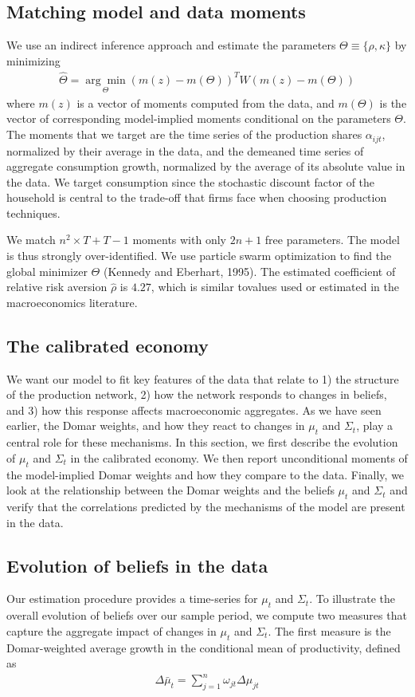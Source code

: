 \documentclass[11pt]{article}
\theoremstyle{definition}
\begin{document}
	\subsection*{Matching model and data moments}
	We use an indirect inference approach and estimate the parameters $\Theta \equiv \{\rho, \kappa\}$ by minimizing
	\begin{align*}
		\hat{\Theta} = \underset{\Theta}{\arg\min} (m(z) - m(\Theta))^T W (m(z) - m(\Theta))
	\end{align*}
	where $m (z)$ is a vector of moments computed from the data, and $m (\Theta)$ is the vector of corresponding model-implied moments conditional on the parameters $\Theta$. The moments that we target are the time series of the production shares $\alpha_{ijt}$, normalized by their average in the data, and the demeaned time series of aggregate consumption growth, normalized by the average of its absolute value in the data. We target consumption since the stochastic discount factor of the household is central to the trade-off that firms face when choosing production techniques.
	
	We match $n^2\times T + T - 1$ moments with only $2n+1$ free parameters. The model is thus strongly over-identified. We use particle swarm optimization to find the global minimizer $\Theta$ (Kennedy and Eberhart, 1995). The estimated coefficient of relative risk aversion $\hat{\rho}$ is $4.27$, which is similar tovalues used or estimated in the macroeconomics literature.
	
	\subsection{The calibrated economy}
	We want our model to fit key features of the data that relate to 1) the structure of the production network, 2) how the network responds to changes in beliefs, and 3) how this response affects macroeconomic aggregates. As we have seen earlier, the Domar weights, and how they react to changes in $\mu_t$ and $\Sigma_t$, play a central role for these mechanisms. In this section, we first describe the evolution of $\mu_t$ and $\Sigma_t$ in the calibrated economy. We then report unconditional moments of the model-implied Domar weights and how they compare to the data. Finally, we look at the relationship between the Domar weights and the beliefs $\mu_t$ and $\Sigma_t$ and verify that the correlations predicted by the mechanisms of the model are present in the data.
	
	\subsection*{Evolution of beliefs in the data}
	Our estimation procedure provides a time-series for $\mu_t$ and $\Sigma_t$. To illustrate the overall evolution of beliefs over our sample period, we compute two measures that capture the aggregate impact of changes in $\mu_t$ and $\Sigma_t$. The first measure is the Domar-weighted average growth in the conditional mean of productivity, defined as
	\setcounter{equation}{69}
	\begin{align}
		\Delta\bar{\mu}_t = \sum\limits_{j=1}^n \omega_{jt}\Delta\mu_{jt}\label{eq-70}
	\end{align}
	
\end{document}
